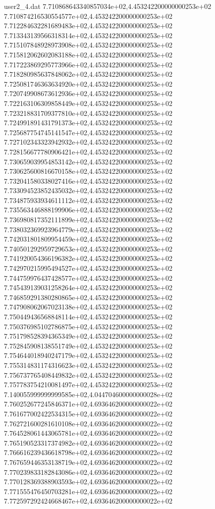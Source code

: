 \begin{filecontents}{user2_4.dat}
7.710868643340857034e+02,4.453242200000000253e+02
7.710874216530554577e+02,4.453242200000000253e+02
7.712284632281689483e+02,4.453242200000000253e+02
7.713343139566318314e+02,4.453242200000000253e+02
7.715107848928973908e+02,4.453242200000000253e+02
7.715812062602083188e+02,4.453242200000000253e+02
7.717223869295773966e+02,4.453242200000000253e+02
7.718280985637848062e+02,4.453242200000000253e+02
7.725081746363634920e+02,4.453242200000000253e+02
7.720749908673612936e+02,4.453242200000000253e+02
7.722163106309858449e+02,4.453242200000000253e+02
7.723218831709377810e+02,4.453242200000000253e+02
7.724991891431791373e+02,4.453242200000000253e+02
7.725687754745141547e+02,4.453242200000000253e+02
7.727102343323942932e+02,4.453242200000000253e+02
7.728156677780906421e+02,4.453242200000000253e+02
7.730659039954853142e+02,4.453242200000000253e+02
7.730625600816670158e+02,4.453242200000000253e+02
7.732041580338027416e+02,4.453242200000000253e+02
7.733094523852435032e+02,4.453242200000000253e+02
7.734875933934611112e+02,4.453242200000000253e+02
7.735563446888199906e+02,4.453242200000000253e+02
7.736980817352111899e+02,4.453242200000000253e+02
7.738032369923964779e+02,4.453242200000000253e+02
7.742031801809954459e+02,4.453242200000000253e+02
7.740501292959729653e+02,4.453242200000000253e+02
7.741920054366196382e+02,4.453242200000000253e+02
7.742970215995494527e+02,4.453242200000000253e+02
7.744759976437428577e+02,4.453242200000000253e+02
7.745439139031258264e+02,4.453242200000000253e+02
7.746859291380280865e+02,4.453242200000000253e+02
7.747908062067023138e+02,4.453242200000000253e+02
7.750449436568848114e+02,4.453242200000000253e+02
7.750376985102786875e+02,4.453242200000000253e+02
7.751798528394365349e+02,4.453242200000000253e+02
7.752845908138551749e+02,4.453242200000000253e+02
7.754644018940247179e+02,4.453242200000000253e+02
7.755314831174316623e+02,4.453242200000000253e+02
7.756737765408449832e+02,4.453242200000000253e+02
7.757783754210081497e+02,4.453242200000000253e+02
7.140055999999999585e+02,4.044704600000000028e+02
7.760252677245846371e+02,4.693646200000000022e+02
7.761677002422534315e+02,4.693646200000000022e+02
7.762721600281610108e+02,4.693646200000000022e+02
7.764528061443065781e+02,4.693646200000000022e+02
7.765190523317374982e+02,4.693646200000000022e+02
7.766616239436618798e+02,4.693646200000000022e+02
7.767659446353138719e+02,4.693646200000000022e+02
7.770239833182843086e+02,4.693646200000000022e+02
7.770128369388903593e+02,4.693646200000000022e+02
7.771555476450703281e+02,4.693646200000000022e+02
7.772597292424668467e+02,4.693646200000000022e+02

\end{filecontents}
